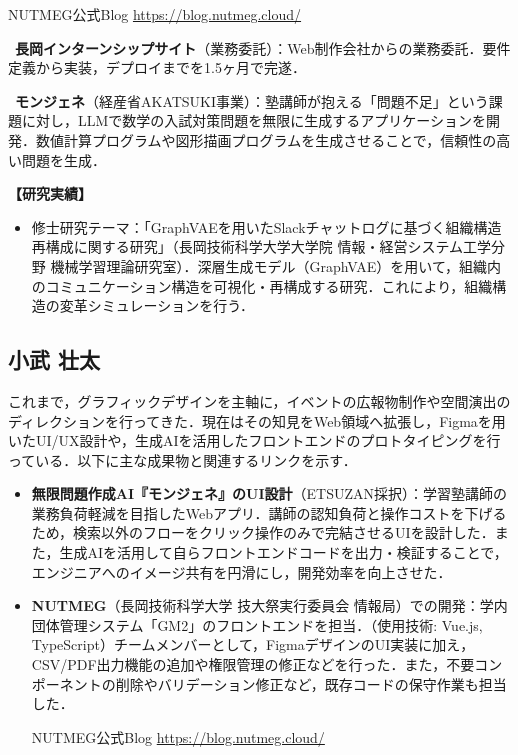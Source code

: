 \documentclass[paper=a4,fontsize=10.5bp,jafontsize=10.5bp,twocolumn]{jlreq}
\begin{document}
{\small\sffamily
\noindent
NUTMEG公式Blog \url{https://blog.nutmeg.cloud/}
}

\noindent\textbullet\ \textbf{長岡インターンシップサイト}（業務委託）：Web制作会社からの業務委託．要件定義から実装，デプロイまでを1.5ヶ月で完遂．

\noindent\textbullet\ \textbf{モンジェネ}（経産省AKATSUKI事業）：塾講師が抱える「問題不足」という課題に対し，LLMで数学の入試対策問題を無限に生成するアプリケーションを開発．数値計算プログラムや図形描画プログラムを生成させることで，信頼性の高い問題を生成．

\textbf{【研究実績】}
\begin{itemize}
  \item 修士研究テーマ：「GraphVAEを用いたSlackチャットログに基づく組織構造再構成に関する研究」（長岡技術科学大学大学院 情報・経営システム工学分野 機械学習理論研究室）．深層生成モデル（GraphVAE）を用いて，組織内のコミュニケーション構造を可視化・再構成する研究．これにより，組織構造の変革シミュレーションを行う．
\end{itemize}

\subsection*{小武 壮太}

これまで，グラフィックデザインを主軸に，イベントの広報物制作や空間演出のディレクションを行ってきた．現在はその知見をWeb領域へ拡張し，Figmaを用いたUI/UX設計や，生成AIを活用したフロントエンドのプロトタイピングを行っている．以下に主な成果物と関連するリンクを示す．

\begin{itemize}
  \item \textbf{無限問題作成AI『モンジェネ』のUI設計}（ETSUZAN採択）：学習塾講師の業務負荷軽減を目指したWebアプリ．講師の認知負荷と操作コストを下げるため，検索以外のフローをクリック操作のみで完結させるUIを設計した．また，生成AIを活用して自らフロントエンドコードを出力・検証することで，エンジニアへのイメージ共有を円滑にし，開発効率を向上させた．

  \item \textbf{NUTMEG}（長岡技術科学大学 技大祭実行委員会 情報局）での開発：学内団体管理システム「GM2」のフロントエンドを担当．（使用技術: Vue.js, TypeScript）チームメンバーとして，FigmaデザインのUI実装に加え，CSV/PDF出力機能の追加や権限管理の修正などを行った．また，不要コンポーネントの削除やバリデーション修正など，既存コードの保守作業も担当した．

  NUTMEG公式Blog \url{https://blog.nutmeg.cloud/}
\end{itemize}
\end{document}
